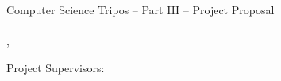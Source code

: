 \documentclass[12pt, a4paper]{article}
\begin{document}



\begin{center}
    \large
    Computer Science Tripos -- Part III -- Project Proposal\\[4mm]

    \LARGE
    \mtitle\\[4mm]

    \normalsize
    \mshortname, \mcollege

    Project Supervisors: \msupervisor

\end{center}

\vspace{5mm}



\newpage

\end{document}
